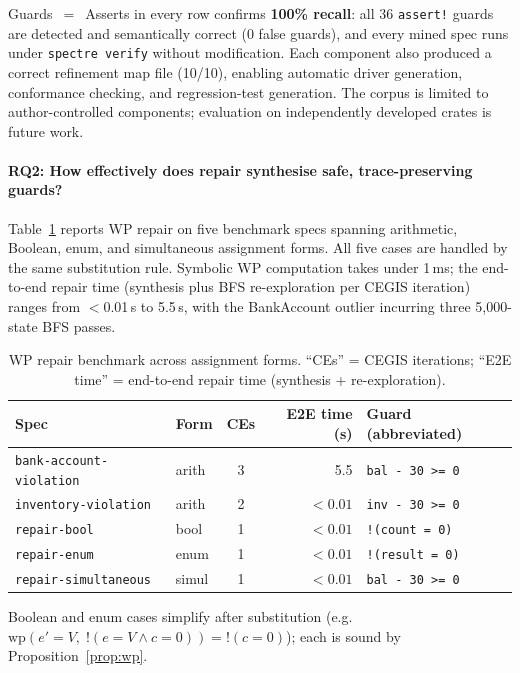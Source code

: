\documentclass[runningheads]{llncs}
\begin{document}
\noindent Guards~$=$~Asserts in every row confirms \textbf{100\% recall}:
all 36 \texttt{assert!} guards are detected and semantically correct
(0 false guards), and every mined spec runs under \texttt{spectre verify}
without modification.
Each component also produced a correct refinement map file (10/10), enabling
automatic driver generation, conformance checking, and regression-test
generation.
The corpus is limited to author-controlled components; evaluation on
independently developed crates is future work.

\paragraph{RQ2: How effectively does repair synthesise safe, trace-preserving guards?}

Table~\ref{tab:repair} reports WP repair on five benchmark specs spanning
arithmetic, Boolean, enum, and simultaneous assignment forms.  All five cases
are handled by the same substitution rule.  Symbolic WP computation takes
under 1\,ms; the end-to-end repair time (synthesis plus BFS re-exploration
per CEGIS iteration) ranges from $<$0.01\,s to 5.5\,s, with the BankAccount
outlier incurring three 5{,}000-state BFS passes.

\begin{table}[t]
\caption{WP repair benchmark across assignment forms.
  ``CEs'' = CEGIS iterations;
  ``E2E time'' = end-to-end repair time (synthesis + re-exploration).}\label{tab:repair}
\centering
\small
\begin{tabular}{llcrl}
\toprule
Spec & Form & CEs & E2E time (s) & Guard (abbreviated) \\
\midrule
\texttt{bank-account-violation} & arith & 3 & 5.5 & \texttt{bal - 30 >= 0} \\
\texttt{inventory-violation}    & arith & 2 & ${<}0.01$ & \texttt{inv - 30 >= 0} \\
\texttt{repair-bool}            & bool  & 1 & ${<}0.01$ & \texttt{!(count = 0)} \\
\texttt{repair-enum}            & enum  & 1 & ${<}0.01$ & \texttt{!(result = 0)} \\
\texttt{repair-simultaneous}    & simul & 1 & ${<}0.01$ & \texttt{bal - 30 >= 0} \\
\bottomrule
\end{tabular}
\end{table}

\noindent Boolean and enum cases simplify after substitution
(e.g.\ $\mathrm{wp}(e' = V,\; !(e = V \wedge c = 0)) = !(c = 0)$);
each is sound by Proposition~\ref{prop:wp}.
\end{document}
